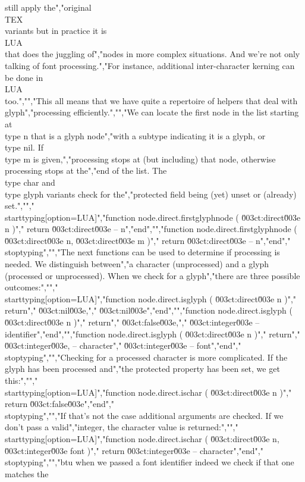 still apply the","original \\TEX\\ variants but in practice it is \\LUA\\ that does the juggling of","nodes in more complex situations. And we're not only talking of font processing.","For instance, additional inter-character kerning can be done in \\LUA\\ too.","","This all means that we have quite a repertoire of helpers that deal with glyph","processing efficiently.","","We can locate the first node in the list starting at \\type {n} that is a glyph node","with a subtype indicating it is a glyph, or \\type {nil}. If \\type {m} is given,","processing stops at (but including) that node, otherwise processing stops at the","end of the list. The \\type {char} and \\type {glyph} variants check for the","protected field being (yet) unset or (already) set.","","\\starttyping[option=LUA]","function node.direct.firstglyphnode ( \u003ct:direct\u003e n )","    return \u003ct:direct\u003e -- n","end","","function node.direct.firstglyphnode ( \u003ct:direct\u003e n, \u003ct:direct\u003e m )","    return \u003ct:direct\u003e -- n","end","\\stoptyping","","The next functions can be used to determine if processing is needed. We distinguish between","a character (unprocessed) and a glyph (processed or unprocessed). When we check for a glyph","there are three possible outcomes:","","\\starttyping[option=LUA]","function node.direct.isglyph ( \u003ct:direct\u003e n )","    return","        \u003ct:nil\u003e,","        \u003ct:nil\u003e","end","","function node.direct.isglyph ( \u003ct:direct\u003e n )","    return","        \u003ct:false\u003e,","        \u003ct:integer\u003e -- identifier","end","","function node.direct.isglyph ( \u003ct:direct\u003e n )","    return","        \u003ct:integer\u003e, -- character","        \u003ct:integer\u003e  -- font","end","\\stoptyping","","Checking for a processed character is more complicated. If the glyph has been processed and","the protected property has been set, we get this:","","\\starttyping[option=LUA]","function node.direct.ischar ( \u003ct:direct\u003e n )","    return \u003ct:false\u003e","end","\\stoptyping","","If that's not the case additional arguments are checked. If we don't pass a valid","integer, the character value is returned:","","\\starttyping[option=LUA]","function node.direct.ischar ( \u003ct:direct\u003e n, \u003ct:integer\u003e font )","    return \u003ct:integer\u003e -- character","end","\\stoptyping","","btu when we passed a font identifier indeed we check if that one matches the 